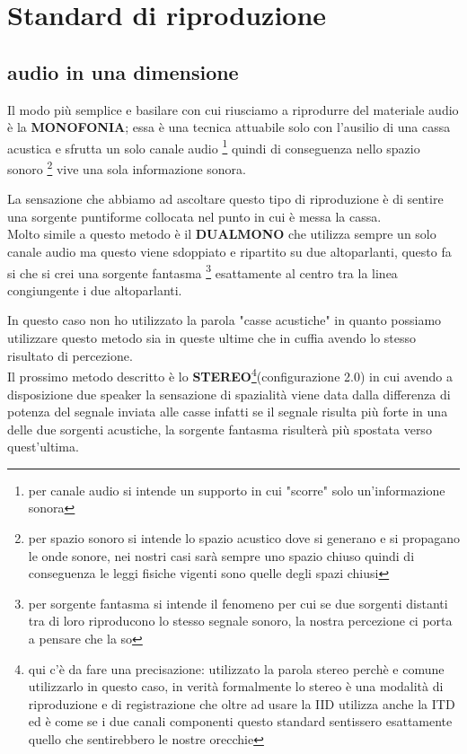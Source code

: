 \documentclass[12pt,a4paper]{report}
\begin{document}
\section{Standard di riproduzione}\label{metodi}

\subsection{audio in una dimensione}
Il modo più semplice e basilare con cui riusciamo a riprodurre del materiale audio è la \textbf{MONOFONIA}; essa è una tecnica attuabile solo con l'ausilio di una cassa acustica e sfrutta un solo canale audio \footnote{per canale audio si intende un supporto in cui "scorre" solo un'informazione sonora}
quindi di conseguenza nello spazio sonoro \footnote{per spazio sonoro si intende lo spazio acustico dove si generano e si propagano le onde sonore, nei nostri casi sarà sempre uno spazio chiuso quindi di conseguenza le leggi fisiche vigenti sono quelle degli spazi chiusi} vive una sola informazione sonora.

La sensazione che abbiamo ad ascoltare questo tipo di riproduzione è di sentire una sorgente puntiforme collocata nel punto in cui è messa la cassa.\\

Molto simile a questo metodo è il \textbf{DUALMONO} che utilizza sempre un solo canale audio ma questo viene sdoppiato e ripartito su due altoparlanti, questo fa si che si crei una sorgente fantasma \footnote{per sorgente fantasma si intende il fenomeno per cui se due sorgenti distanti tra di loro riproducono lo stesso segnale sonoro, la nostra percezione ci porta a pensare che la so} esattamente al centro tra la linea congiungente i due altoparlanti. 

In questo caso non ho utilizzato la parola "casse acustiche" in quanto possiamo utilizzare questo metodo sia in queste ultime che in cuffia avendo lo stesso risultato di percezione.\\

Il prossimo metodo descritto è lo \textbf{STEREO}\footnote{qui c'è da fare una precisazione: utilizzato la parola stereo perchè e comune utilizzarlo in questo caso, in verità formalmente lo stereo è una modalità di riproduzione e di registrazione che oltre ad usare la IID utilizza anche la ITD ed è come se i due canali componenti questo standard sentissero esattamente quello che sentirebbero le nostre orecchie}(configurazione 2.0) in cui avendo a disposizione due speaker la sensazione di spazialità viene data dalla differenza di potenza del segnale inviata alle casse infatti se il segnale risulta più forte in una delle due sorgenti acustiche, la sorgente fantasma risulterà più spostata verso quest'ultima.
\end{document}
